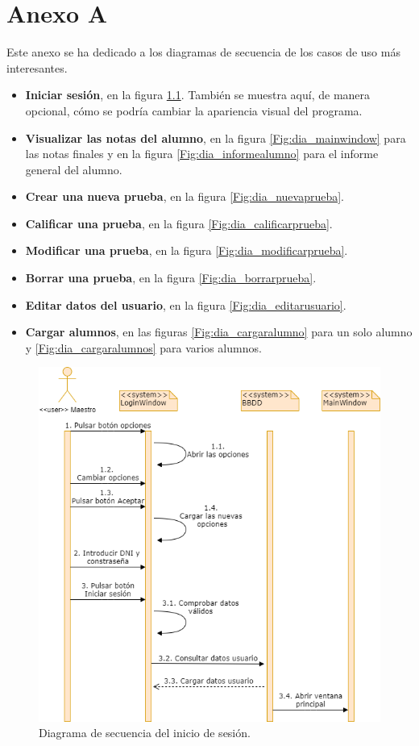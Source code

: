 \chapter{Anexo A}
\label{cap:AnexoA}

Este anexo se ha dedicado a los diagramas de secuencia de los casos de uso más interesantes.

\begin{itemize}
	\item\textbf{Iniciar sesión}, en la figura \ref{Fig:dia_iniciarsesion}. También se muestra aquí, de manera opcional, cómo se podría cambiar la apariencia visual del programa.
	\item\textbf{Visualizar las notas del alumno}, en la figura \ref{Fig:dia_mainwindow} para las notas finales y en la figura \ref{Fig:dia_informealumno} para el informe general del alumno.
	\item\textbf{Crear una nueva prueba}, en la figura \ref{Fig:dia_nuevaprueba}.
	\item\textbf{Calificar una prueba}, en la figura \ref{Fig:dia_calificarprueba}.
	\item\textbf{Modificar una prueba}, en la figura \ref{Fig:dia_modificarprueba}.
	\item\textbf{Borrar una prueba}, en la figura \ref{Fig:dia_borrarprueba}.
	\item\textbf{Editar datos del usuario}, en la figura \ref{Fig:dia_editarusuario}.
	\item\textbf{Cargar alumnos}, en las figuras \ref{Fig:dia_cargaralumno} para un solo alumno y \ref{Fig:dia_cargaralumnos} para varios alumnos.
\end{itemize}

\begin{figure}[h]
\centering\includegraphics[width=1\linewidth]{figs/dia_iniciarsesion.png}
\caption{Diagrama de secuencia del inicio de sesión.}
\label{Fig:dia_iniciarsesion}
\end{figure}

